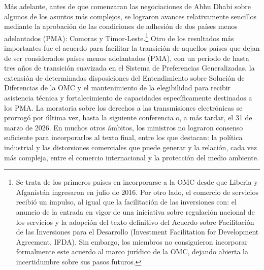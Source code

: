 \documentclass[10pt,a4paper]{article}
\begin{document}
Más adelante, antes de que comenzaran las negociaciones de Abhu Dhabi sobre algunos de los asuntos más complejos, se lograron avances relativamente sencillos mediante la aprobación de las condiciones de adhesión de dos países menos adelantados (PMA): Comoras y Timor-Leste.\footnote{%
  Se trata de los primeros países en incorporarse a la OMC desde que Liberia y Afganistán ingresaron en julio de 2016. Por otro lado, el comercio de servicios recibió un impulso, al igual que la facilitación de las inversiones con: el anuncio de la entrada en vigor de una iniciativa sobre regulación nacional de los servicios y la adopción del texto definitivo del Acuerdo sobre Facilitación de las Inversiones para el Desarrollo (Investment Facilitation for Development Agreement, IFDA). Sin embargo, los miembros no consiguieron incorporar formalmente este acuerdo al marco jurídico de la OMC, dejando abierta la incertidumbre sobre sus pasos futuros.
} Otro de los resultados más importantes fue el acuerdo para facilitar la transición de aquellos países que dejan de ser considerados países menos adelantados (PMA), con un período de hasta tres años de transición suavizada en el Sistema de Preferencias Generalizadas, la extensión de determinadas disposiciones del Entendimiento sobre Solución de Diferencias de la OMC y el mantenimiento de la elegibilidad para recibir asistencia técnica y fortalecimiento de capacidades específicamente destinados a los PMA. La moratoria sobre los derechos a las transmisiones electrónicas se prorrogó por última vez, hasta la siguiente conferencia o, a más tardar, el 31 de marzo de 2026. En muchos otros ámbitos, los ministros no lograron consenso suficiente para incorporarlos al texto final, entre los que destacan: la política industrial y las distorsiones comerciales que puede generar y la relación, cada vez más compleja, entre el comercio internacional y la protección del medio ambiente.
\end{document}
